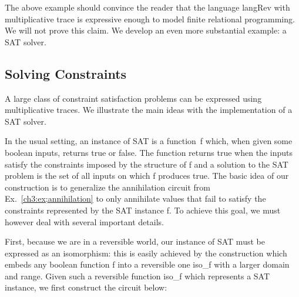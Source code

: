 \documentclass{llncs}
\begin{document}
%     

The above example should convince the reader that the language {{langRev}}
with multiplicative trace is expressive enough to model finite relational
programming. We will not prove this claim. We develop an even more
substantial example: a SAT solver.

\subsection{Solving Constraints}
\label{ch3:sec:constraints}

A large class of constraint satisfaction problems can be expressed
using multiplicative traces. We illustrate the main ideas with the
implementation of a SAT solver.

In the usual setting, an instance of SAT is a function~{{f}} which,
when given some boolean inputs, returns {{true}} or {{false}}. The
function returns {{true}} when the inputs satisfy the constraints
imposed by the structure of {{f}} and a solution to the SAT problem is
the set of all inputs on which {{f}} produces {{true}}. The basic idea
of our construction is to generalize the annihilation circuit from
Ex.~\ref{ch3:ex;annihilation} to only annihilate values that fail to
satisfy the constraints represented by the SAT instance {{f}}. To
achieve this goal, we must however deal with several important
details.

First, because we are in a reversible world, our instance of SAT must be
expressed as an isomorphism: this is easily achieved by the construction
which embeds any boolean function {{f}} into a reversible one {{iso_f}} with
a larger domain and range.  Given such a reversible function {{iso_f}} which
represents a SAT instance, we first construct the circuit below:

\begin{center}
\end{center}  
\end{document}
